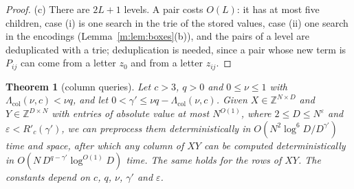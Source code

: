 \documentclass[11pt]{article}
\newtheorem{theorem}{Theorem}[section]
\theoremstyle{definition}
\theoremstyle{remark}
\newcommand{\Z}{\mathbb{Z}}
\begin{document}
\begin{proof}
(c) There are $2L+1$ levels. A pair costs $O(L)$: it has at most five children, case (i) is one search in the trie of the stored values, case (ii) one search in the encodings (Lemma~\ref{m:lem:boxes}(b)), and the pairs of a level are deduplicated with a trie; deduplication is needed, since a pair whose new term is $P_{ij}$ can come from a letter $z_0$ and from a letter $z_{ij}$.
\end{proof}

\begin{theorem}[column queries]\label{m:thm:colds}
Let $c>3$, $q>0$ and $0\le\nu\le1$ with $\Lambda_{\mathrm{col}}(\nu,c)<\nu q$, and let $0<\gamma'\le\nu q-\Lambda_{\mathrm{col}}(\nu,c)$. Given $X\in\Z^{N\times D}$ and $Y\in\Z^{D\times N}$ with entries of absolute value at most $N^{O(1)}$, where $2\le D\le N^\varepsilon$ and $\varepsilon<R'_c(\gamma')$, we can preprocess them deterministically in $O(N^2\log^6\!D/D^{\gamma'})$ time and space, after which any column of $XY$ can be computed deterministically in $O(N\,D^{q-\gamma'}\log^{O(1)}\!D)$ time. The same holds for the rows of $XY$. The constants depend on $c$, $q$, $\nu$, $\gamma'$ and $\varepsilon$.
\end{theorem}
\end{document}
